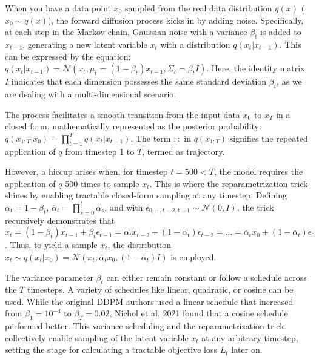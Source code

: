 When you have a data point \( x_0 \) sampled from the real data distribution \( q(x) \) (\( x_0 \sim q(x) \)), the forward diffusion process kicks in by adding noise. Specifically, at each step in the Markov chain, Gaussian noise with a variance \( \beta_t \) is added to \( x_{t-1} \), generating a new latent variable \( x_t \) with a distribution \( q(x_t | x_{t-1}) \). This can be expressed by the equation: \( q(x_t | x_{t-1}) = \mathcal{N}(x_t; \mu_t = (1 - \beta_t)x_{t-1}, \Sigma_t = \beta_t I) \). Here, the identity matrix \( I \) indicates that each dimension possesses the same standard deviation \( \beta_t \), as we are dealing with a multi-dimensional scenario.

The process facilitates a smooth transition from the input data \( x_0 \) to \( x_T \) in a closed form, mathematically represented as the posterior probability: \( q(x_{1:T} | x_0) = \prod_{t=1}^T q(x_t | x_{t-1}) \). The term \( :: \) in \( q(x_{1:T}) \) signifies the repeated application of \( q \) from timestep 1 to \( T \), termed as trajectory.

However, a hiccup arises when, for timestep \( t = 500 < T \), the model requires the application of \( q \) 500 times to sample \( x_t \). This is where the reparametrization trick shines by enabling tractable closed-form sampling at any timestep. Defining \( \alpha_t = 1 - \beta_t \), \( \overline{\alpha}_t = \prod_{s=0}^t \alpha_s \), and with \( \epsilon_{0,...,t-2,t-1} \sim \mathcal{N}(0,I) \), the trick recursively demonstrates that \( x_t = (1 - \beta_t) x_{t-1} + \beta_t \epsilon_{t-1} = \alpha_t x_{t-2} + (1 - \alpha_t) \epsilon_{t-2} = ... = \overline{\alpha}_t x_0 + (1 - \overline{\alpha}_t) \epsilon_0 \). Thus, to yield a sample \( x_t \), the distribution \( x_t \sim q(x_t | x_0) = \mathcal{N}(x_t; \overline{\alpha}_t x_0, (1 - \overline{\alpha}_t) I) \) is employed.

The variance parameter \( \beta_t \) can either remain constant or follow a schedule across the \( T \) timesteps. A variety of schedules like linear, quadratic, or cosine can be used. While the original DDPM authors used a linear schedule that increased from \( \beta_1 = 10^{-4} \) to \( \beta_T = 0.02 \), Nichol et al. 2021 found that a cosine schedule performed better. This variance scheduling and the reparametrization trick collectively enable sampling of the latent variable \( x_t \) at any arbitrary timestep, setting the stage for calculating a tractable objective loss \( L_t \) later on.